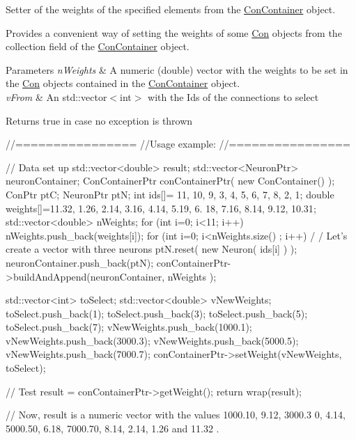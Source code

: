 Setter of the weights of the specified elements from the \hyperlink{class_con_container}{ConContainer} object. 

Provides a convenient way of setting the weights of some \hyperlink{class_con}{Con} objects from the collection field of the \hyperlink{class_con_container}{ConContainer} object.


\begin{DoxyParams}{Parameters}
{\em nWeights} & A numeric (double) vector with the weights to be set in the \hyperlink{class_con}{Con} objects contained in the \hyperlink{class_con_container}{ConContainer} object. \\
\hline
{\em vFrom} & An std::vector$<$int$>$ with the Ids of the connections to select\\
\hline
\end{DoxyParams}
\begin{DoxyReturn}{Returns}
true in case no exception is thrown
\end{DoxyReturn}

\begin{DoxyCode}
        //================
        //Usage example:
        //================

        // Data set up
                std::vector<double> result;
                        std::vector<NeuronPtr> neuronContainer;
                        ConContainerPtr conContainerPtr( new ConContainer() );
                        ConPtr  ptC;
                        NeuronPtr ptN;
                        int ids[]= {11, 10, 9, 3, 4, 5, 6, 7, 8, 2, 1};
                        double weights[]={11.32, 1.26, 2.14, 3.16, 4.14, 5.19, 6.
      18, 7.16, 8.14, 9.12, 10.31};
                        std::vector<double> nWeights;
                        for (int i=0; i<11; i++) {
                        nWeights.push_back(weights[i]);
                        }
                        for (int i=0; i<nWeights.size() ; i++) {                                /
      / Let's create a vector with three neurons
                        ptN.reset( new Neuron( ids[i] ) );
                        neuronContainer.push_back(ptN);
                        }
                        conContainerPtr->buildAndAppend(neuronContainer, nWeights
      );

                        std::vector<int> toSelect;
                        std::vector<double> vNewWeights;
                        toSelect.push_back(1);
                        toSelect.push_back(3);
                        toSelect.push_back(5);
                        toSelect.push_back(7);
                        vNewWeights.push_back(1000.1);
                        vNewWeights.push_back(3000.3);
                        vNewWeights.push_back(5000.5);
                        vNewWeights.push_back(7000.7);
                        conContainerPtr->setWeight(vNewWeights, toSelect);

        // Test
                        result = conContainerPtr->getWeight();
                        return wrap(result);

        // Now, result is a numeric vector with the values  1000.10, 9.12, 3000.3
      0, 4.14, 5000.50, 6.18, 7000.70, 8.14, 2.14, 1.26 and 11.32 .
\end{DoxyCode}


